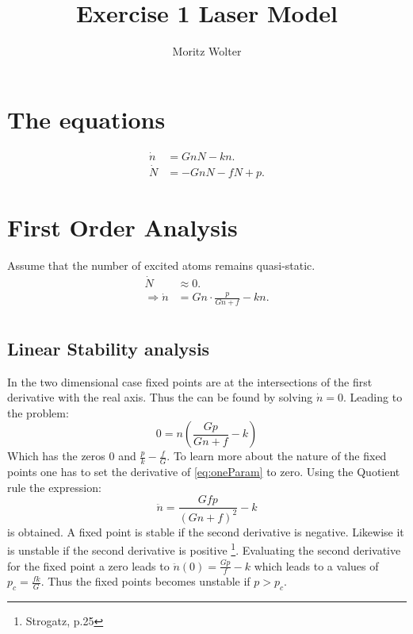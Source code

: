 




\title{Exercise 1 Laser Model}
\author{Moritz Wolter}

\maketitle

\section{The equations}
\begin{align}
\dot{n} &= GnN - kn. \\
\dot{N} &= -GnN - fN + p.
\end{align}


\section{First Order Analysis}
Assume that the number of excited atoms remains quasi-static. 
\begin{align}
\dot{N} &\approx 0. \\
\Rightarrow \dot{n} &= Gn \cdot \frac{p}{Gn + f} - kn. \label{eq:oneParam}\\
\end{align}
\subsection{Linear Stability analysis}
In the two dimensional case fixed points are at the intersections of the first derivative with the real axis. Thus the can be found by solving $\dot{n}=0$. Leading to the problem:
\begin{equation}
0 = n ( \frac{Gp}{Gn+f} - k)
\end{equation}
Which has the zeros $0$ and $\frac{p}{k} - \frac{f}{G}$. To learn more about the nature of the fixed points one has to set the derivative of \ref{eq:oneParam} to zero. Using the Quotient rule the expression: 
\begin{equation}
\ddot{n} = \frac{Gfp}{(Gn+f)^2} - k   
\label{eq:secondDiv} 
\end{equation}
is obtained. A fixed point is stable if the second derivative is negative. Likewise it is unstable if the second derivative is positive \footnote{Strogatz, p.25}.
Evaluating the second derivative for the fixed point a zero leads to $\ddot{n}(0) = \frac{Gp}{f} - k$ which leads to a values of $p_c = \frac{fk}{G}$. Thus the fixed points becomes unstable if $p > p_c$.

